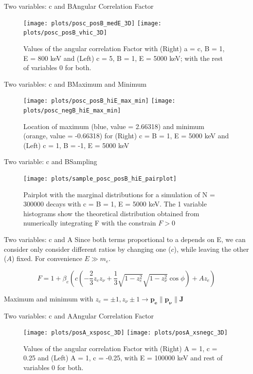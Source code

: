 \documentclass{beamer}
\begin{document}
\begin{frame}{Two variables: c and B}{Angular Correlation Factor}
	\begin{figure}
		\centering
		\texttt{[image: plots/posc\_posB\_medE\_3D]}
		\texttt{[image: plots/posc\_posB\_vhic\_3D]}
		\caption{Values of the angular correlation Factor with (Right) a = c, B = 1, E = 800 keV and (Left) c = 5, B = 1, E = 5000 keV; with the rest of variables 0 for both.}
	\end{figure}
\end{frame}
\begin{frame}{Two variables: c and B}{Maximum and Minimum}
	\begin{figure}
		\centering
		\texttt{[image: plots/posc\_posB\_hiE\_max\_min]}
		\texttt{[image: plots/posc\_negB\_hiE\_max\_min]}
		\caption{Location of maximum (blue, value = 2.66318) and minimum (orange, value = -0.66318) for (Right) c = B = 1, E = 5000 keV and (Left) c = 1, B = -1, E = 5000 keV}
	\end{figure}
\end{frame}
\begin{frame}{Two variable: c and B}{Sampling}
	\begin{figure}
		\centering
		\texttt{[image: plots/sample\_posc\_posB\_hiE\_pairplot]}
		\caption{Pairplot with the marginal distributions for a simulation of N = 300000 decays with c = B = 1, E = 5000 keV. The 1 variable histograms show the theoretical distribution obtained from numerically integrating F with the constrain $F > 0$}
	\end{figure}
\end{frame}
\begin{frame}{Two variables: c and A}
	Since both terms proportional to a depends on E, we can consider only consider different ratios by changing one ($c$), while leaving the other ($A$) fixed. For convenience $E \gg m_e$.
	
	$$F = 1 + \beta_e\left(c \left(-\frac 23 z_ez_\nu + \frac 13 \sqrt{1-z^2_e}\sqrt{1-z^2_\nu}\cos \phi\right) + Az_e\right)$$
	
	Maximum and minimum with $z_e=\pm1,z_\nu \pm1 \rightarrow \boldsymbol{p_e} \parallel \boldsymbol{p_\nu} \parallel \boldsymbol{J}$  
	
\end{frame}
\begin{frame}{Two variables: c and A}{Angular Correlation Factor}
	\begin{figure}
		\centering
		\texttt{[image: plots/posA\_xsposc\_3D]}
		\texttt{[image: plots/posA\_xsnegc\_3D]}
		\caption{Values of the angular correlation Factor with (Right) A = 1, c = 0.25 and (Left) A = 1, c = -0.25, with E = 100000 keV and rest of variables 0 for both.}
	\end{figure}
\end{frame}
\end{document}
